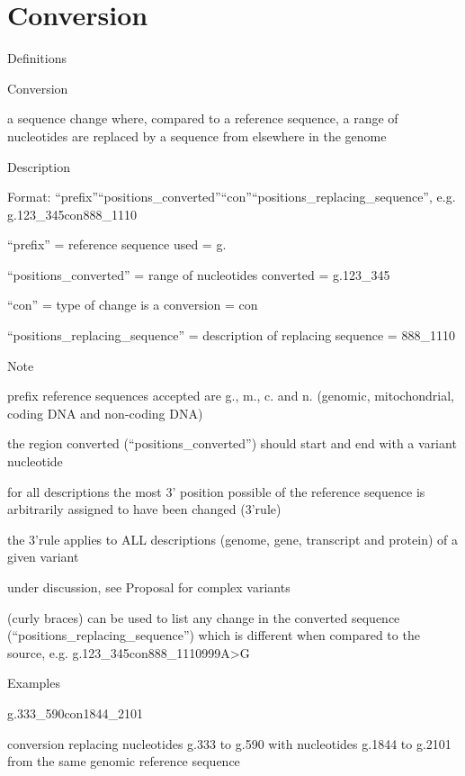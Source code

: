 \documentclass{book}
\begin{document}
	

	\section{Conversion}

	Definitions

	Conversion

	a sequence change where, compared to a reference sequence, a range of nucleotides are replaced by a sequence from elsewhere in the genome

	

	

	Description

	Format: “prefix”“positions\_converted”“con”“positions\_replacing\_sequence”, e.g. g.123\_345con888\_1110

	“prefix” = reference sequence used = g.

	“positions\_converted” = range of nucleotides converted = g.123\_345

	“con” = type of change is a conversion = con

	“positions\_replacing\_sequence” = description of replacing sequence = 888\_1110

	

	Note

	prefix reference sequences accepted are g., m., c. and n. (genomic, mitochondrial, coding DNA and non-coding DNA)

	the region converted (“positions\_converted”) should start and end with a variant nucleotide

	for all descriptions the most 3’ position possible of the reference sequence is arbitrarily assigned to have been changed (3’rule) 

	the 3’rule applies to ALL descriptions (genome, gene, transcript and protein) of a given variant

	under discussion, see Proposal for complex variants

	{ } (curly braces) can be used to list any change in the converted sequence (“positions\_replacing\_sequence”) which is different when compared to the source, e.g. g.123\_345con888\_1110{999A>G}

	

	

	Examples

	g.333\_590con1844\_2101

	conversion replacing nucleotides g.333 to g.590 with nucleotides g.1844 to g.2101 from the same genomic reference sequence
\end{document}
